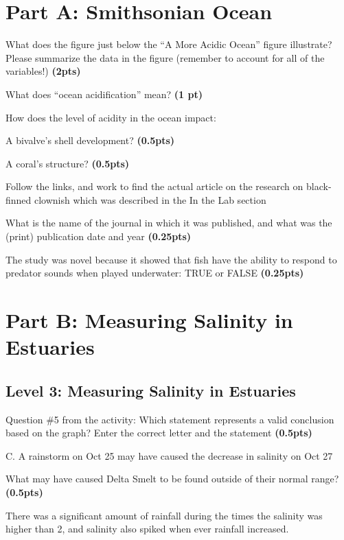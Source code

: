 \documentclass[12pt,letterpaper]{article}
\begin{document}
\section*{Part A: Smithsonian Ocean}
\begin{enumerate}[font=\bfseries, wide]
    {\color{under}\item What does the figure just below the  “A More Acidic Ocean” figure illustrate? Please summarize the data in the figure (remember to account for all of the variables!) \textbf{(2pts)}}
    {\color{under}\item What does “ocean acidification” mean? \textbf{(1 pt)}}
    {\color{under}\item How does the level of acidity in the ocean impact:}
    \begin{enumerate}
        {\color{under}\item  A bivalve’s shell development? \textbf{(0.5pts)}}
        {\color{under}\item  A coral’s structure? \textbf{(0.5pts)}}
    \end{enumerate}
    {\color{under}\item Follow the links, and work to find the actual article on the research on black-finned clownish which was described in the In the Lab section}
    \begin{enumerate}
        {\color{under}\item What is the name of the journal in which it was published, and what was the (print) publication date and year \textbf{(0.25pts)}}
        {\color{under}\item The study was novel because it showed that fish have the ability to respond to predator sounds when played underwater:  TRUE or FALSE \textbf{(0.25pts)}}
    \end{enumerate}
\end{enumerate}

\section*{Part B: Measuring Salinity in Estuaries}
\subsection*{Level 3: Measuring Salinity in Estuaries}
\begin{enumerate}[font=\bfseries, wide, resume]
    {\color{under}\item Question \#5 from the activity: Which statement represents a valid conclusion based on the graph?  Enter the correct letter and the statement \textbf{(0.5pts)}}

    C. A rainstorm on Oct 25 may have caused the decrease in salinity on Oct 27

    {\color{under}\item What may have caused Delta Smelt to be found outside of their normal range? \textbf{(0.5pts)} }

    There was a significant amount of rainfall during the times the salinity was higher than 2, and salinity also spiked when ever rainfall increased. 
\end{enumerate}
\end{document}
